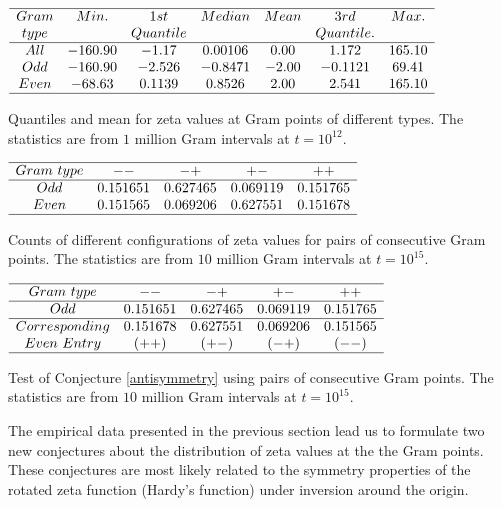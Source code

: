 \documentclass[twoside]{article}
\theoremstyle{definition}
\begin{document}
\begin{table}
\centering \(\begin{array}{ccccccc}
\hline
 Gram &     Min.   & 1st    &  Median    &   Mean   & 3rd    &   Max. \\
 type &              & Quantile   &            &              & Quantile.    &   \\
\hline
All& -160.90 &   -1.17 &    0.00106 &   0.00  &  1.172 &165.10\\
Odd&-160.90 &   -2.526 &   -0.8471  & -2.00 &   -0.1121 &  69.41 \\
Even&-68.63 &   0.1139 &  0.8526  & 2.00 &   2.541 & 165.10 \\
\hline
\end{array}\)
\caption{Quantiles and mean for zeta values at Gram points of different types.  The statistics are from $1$ million Gram intervals at $t=10^{12}$.} \label{tab:quantiles}
\end{table}


\begin{table}
\centering \(\begin{array}{ccccc}
\hline
 Gram~type&   --   & -+   & +-   & ++  \\
\hline
Odd & 0.151651&0.627465&0.069119&0.151765 \\
Even & 0.151565&0.069206&0.627551&0.151678 \\
\hline
\end{array}\)
\caption{Counts of different configurations of zeta values for pairs of consecutive Gram points.  The statistics are from $10$ million Gram intervals at $t=10^{15}$.} \label{tab:pairraw}
\end{table}

\begin{table}
\centering \(\begin{array}{ccccc}
\hline
 Gram~type&   --   & -+   & +-   & ++  \\
\hline
Odd & 0.151651&0.627465&0.069119&0.151765\\
\hline
Corresponding& 0.151678 & 0.627551 & 0.069206& 0.151565\\ 
Even~Entry     & (++)     & (+-)   & (-+)  & (--) \\
\hline
\end{array}\)
\caption{Test of Conjecture \ref{antisymmetry} using pairs of consecutive Gram points.  The statistics are from $10$ million Gram intervals at $t=10^{15}$.} \label{tab:pairtest}
\end{table}


The empirical data presented in the previous section lead us to formulate two new conjectures  about the distribution of zeta values at the 
the Gram points. These conjectures are most likely related to the symmetry properties of the rotated zeta function (Hardy's function) under inversion around the origin. 
\end{document}
